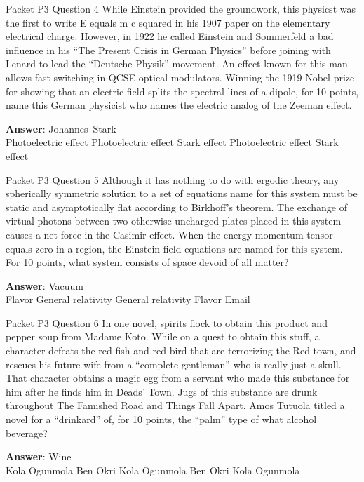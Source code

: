 \begin{frame}{Packet P3 Question 4}
While Einstein provided the groundwork, this physicst was the first to write E equals m c squared in his 1907 paper on the elementary electrical charge.  However, in 1922 he called Einstein and Sommerfeld a bad influence in his ``The Present Crisis in German Physics'' before joining with Lenard to lead     the ``Deutsche Physik'' movement.  An effect known for this man allows fast switching in QCSE optical modulators.  Winning the 1919 Nobel prize for showing that an electric field splits   the spectral lines of a dipole, for   10 points, name this German physicist who names the electric analog of the Zeeman   effect.    

\textbf{Answer}: Johannes\ Stark\\
 Photoelectric effect
 Photoelectric effect
 Stark effect
 Photoelectric effect
 Stark effect
\end{frame}

\begin{frame}{Packet P3 Question 5}
Although it has nothing   to do with ergodic theory, any spherically symmetric solution to a set of equations name for this system must be static and asymptotically flat according to Birkhoff's theorem. The exchange of virtual photons between two otherwise uncharged plates placed in this system causes a net force in the Casimir effect. When the energy-momentum tensor equals zero in a region, the Einstein field equations   are named for this system. For 10 points, what system consists of space devoid of all matter?        

\textbf{Answer}: Vacuum\\
 Flavor
 General relativity
 General relativity
 Flavor
 Email
\end{frame}

\begin{frame}{Packet P3 Question 6}
In one novel, spirits flock to obtain this product and pepper soup from Madame Koto. While on a quest to obtain this stuff, a character defeats   the red-fish and red-bird that are terrorizing the Red-town, and rescues his future wife from a “complete gentleman” who is really just a skull. That character obtains a magic egg from a servant who made this substance   for him after he finds him in Deads’ Town. Jugs of this substance are drunk throughout The Famished Road and Things Fall   Apart. Amos Tutuola titled a novel for a “drinkard” of, for 10 points, the “palm” type of what alcohol beverage?      

\textbf{Answer}: Wine\\
 Kola Ogunmola
 Ben Okri
 Kola Ogunmola
 Ben Okri
 Kola Ogunmola
\end{frame}


